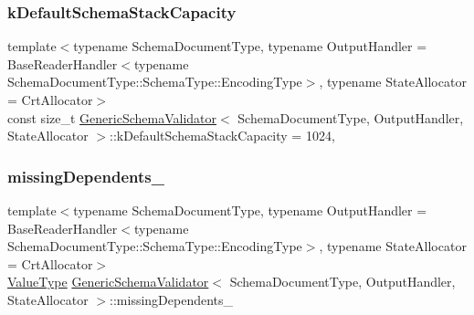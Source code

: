 \mbox{\label{classGenericSchemaValidator_aab8510602779c91bc5b55ea81fd7385b}} 
\subsubsection{\texorpdfstring{k\+Default\+Schema\+Stack\+Capacity}{kDefaultSchemaStackCapacity}}
{\footnotesize\ttfamily template$<$typename Schema\+Document\+Type, typename Output\+Handler = Base\+Reader\+Handler$<$typename Schema\+Document\+Type\+::\+Schema\+Type\+::\+Encoding\+Type$>$, typename State\+Allocator = Crt\+Allocator$>$ \\
const size\+\_\+t \hyperlink{classGenericSchemaValidator}{Generic\+Schema\+Validator}$<$ Schema\+Document\+Type, Output\+Handler, State\+Allocator $>$\+::k\+Default\+Schema\+Stack\+Capacity = 1024\hspace{0.3cm}{\ttfamily [static]}, {\ttfamily [private]}}

\mbox{\label{classGenericSchemaValidator_a08633a530070c002f9f0016991a22187}} 
\subsubsection{\texorpdfstring{missing\+Dependents\+\_\+}{missingDependents\_}}
{\footnotesize\ttfamily template$<$typename Schema\+Document\+Type, typename Output\+Handler = Base\+Reader\+Handler$<$typename Schema\+Document\+Type\+::\+Schema\+Type\+::\+Encoding\+Type$>$, typename State\+Allocator = Crt\+Allocator$>$ \\
\hyperlink{classGenericSchemaValidator_a435890a2dddeecb896d4ac76de03ca68}{Value\+Type} \hyperlink{classGenericSchemaValidator}{Generic\+Schema\+Validator}$<$ Schema\+Document\+Type, Output\+Handler, State\+Allocator $>$\+::missing\+Dependents\+\_\+\hspace{0.3cm}{\ttfamily [private]}}

\mbox{\label{classGenericSchemaValidator_ac03855c6eb85ffcae993105082e09fc1}} 
